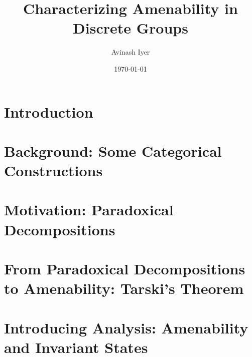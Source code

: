 \documentclass[10pt]{package2}
\title{Characterizing Amenability in Discrete Groups}
\author{Avinash Iyer}
\date{\today}
\newcommand{\1}{\mathds{1}}
\begin{document}
\maketitle
\RaggedRight
\tableofcontents
\chapter{Introduction}
%
\chapter{Background: Some Categorical Constructions}

\chapter{Motivation: Paradoxical Decompositions}

\chapter{From Paradoxical Decompositions to Amenability: Tarski's Theorem}

\chapter{Introducing Analysis: Amenability and Invariant States}

\end{document}

